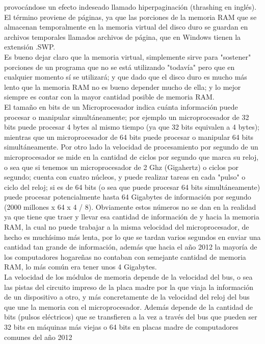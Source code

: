 \documentclass{article}
\begin{document}
provocándose un efecto indeseado llamado hiperpaginación (thrashing en inglés). El término
proviene de páginas, ya que las porciones de la memoria RAM que se almacenan temporalmente
en la memoria virtual del disco duro se guardan en archivos temporales llamados archivos de
página, que en Windows tienen la extensión .SWP.\\[0.1cm]
Es bueno dejar claro que la memoria virtual, simplemente sirve para "sostener" porciones de
un programa que no se está utilizando "todavía" pero que en cualquier momento sí se
utilizará; y que dado que el disco duro es mucho más lento que la memoria RAM no es bueno
depender mucho de ella; y lo mejor siempre es contar con la mayor cantidad posible de
memoria RAM.\\[0.1cm]
El tamaño en bits de un Microprocesador indica cuánta información puede procesar o
manipular simultáneamente; por ejemplo un microprocesador de 32 bits puede procesar 4
bytes al mismo tiempo (ya que 32 bits equivalen a 4 bytes); mientras que un microprocesador
de 64 bits puede procesar o manipular 64 bits simultáneamente. Por otro lado la velocidad de
procesamiento por segundo de un microprocesador se mide en la cantidad de ciclos por
segundo que marca su reloj, o sea que si tenemos un microprocesador de 2 Ghz (Gigahertz) o
ciclos por segundo; cuenta con cuatro núcleos, y puede realizar tareas en cada "pulso" o ciclo
del reloj; si es de 64 bits (o sea que puede procesar 64 bits simultáneamente) puede procesar
potencialmente hasta 64 Gigabytes de información por segundo (2000 millones x 64 x 4 / 8).
Obviamente estos números no se dan en la realidad ya que tiene que traer y llevar esa cantidad
de información de y hacia la memoria RAM, la cual no puede trabajar a la misma velocidad del
microprocesador, de hecho es muchísimo más lenta, por lo que se tardan varios segundos en
enviar una cantidad tan grande de información, además que hacia el año 2012 la mayoría de los
computadores hogareñas no contaban con semejante cantidad de memoria RAM, lo más común
era tener unos 4 Gigabytes.\\[0.1cm]
La velocidad de los módulos de memoria depende de la velocidad del bus, o sea las pistas del
circuito impreso de la placa madre por la que viaja la información de un dispositivo a otro, y
más concretamente de la velocidad del reloj del bus que une la memoria con el
microprocesador. Además depende de la cantidad de bits (pulsos eléctricos) que se transfieren
a la vez a través del bus que pueden ser 32 bits en máquinas más viejas o 64 bits en placas
madre de computadores comunes del año 2012\\[0.1cm]
\end{document}
